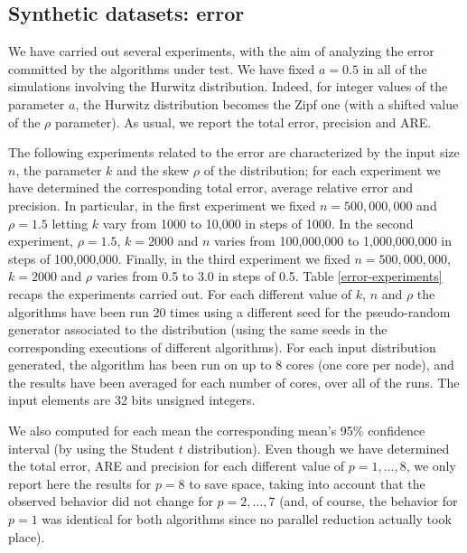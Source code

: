 \documentclass[final,3p,times]{elsarticle}
\begin{document}
\subsection{Synthetic datasets: error}
\label{error}
We have carried out several experiments, with the aim of analyzing the error committed by the algorithms under test. We have fixed $a=0.5$ in all of the simulations involving the Hurwitz distribution. Indeed, for integer values of the parameter $a$, the Hurwitz distribution becomes the Zipf one (with a shifted value of the $\rho$ parameter). As usual, we report the total error, precision and ARE. 

The following experiments related to the error are characterized by the input size $n$, the parameter $k$ and the skew $\rho$ of the distribution; for each experiment we have determined the corresponding total error,  average relative error and precision. In particular, in the first experiment we fixed $n = 500,000,000$ and $\rho = 1.5$ letting $k$ vary from 1000 to 10,000 in steps of 1000. In the second experiment, $\rho = 1.5$, $k = 2000$ and $n$ varies from 100,000,000 to 1,000,000,000 in steps of 100,000,000. Finally, in the third experiment we fixed $n = 500,000,000$, $k = 2000$ and $\rho$ varies from 0.5 to 3.0 in steps of 0.5. Table \ref{error-experiments} recaps the experiments carried out. For each different value of $k$, $n$ and $\rho$ the algorithms have been run 20 times using a different seed for the pseudo-random generator associated to the distribution (using the same seeds in the corresponding executions of different algorithms). For each input distribution generated, the algorithm has been run on up to 8 cores (one core per node), and the results have been averaged for each number of cores, over all of the runs. The input elements are 32 bits unsigned integers.

We also computed for each mean the corresponding mean's 95\% confidence interval (by using the Student $t$ distribution). Even though we have determined the total error, ARE and precision for each different value of $p = 1, \dots, 8$, we only report here the results for $p = 8$ to save space, taking into account that the observed behavior did not change for $p = 2, \dots, 7$ (and, of course, the behavior for $p = 1$ was identical for both algorithms since no parallel reduction actually took place).
\end{document}
